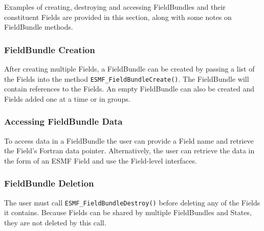 

Examples of creating, destroying and accessing FieldBundles and their
constituent Fields are provided in this section, along with some
notes on FieldBundle methods.

\subsubsection{FieldBundle Creation}

After creating multiple Fields, a FieldBundle
can be created by passing a list of the Fields into the 
method {\tt ESMF\_FieldBundleCreate()}.  The FieldBundle will contain
references to the Fields.  An empty FieldBundle can also be created
and Fields added one at a time or in groups.

\subsubsection{Accessing FieldBundle Data}

To access data in a FieldBundle the user can provide a Field
name and retrieve the Field's Fortran data pointer.  Alternatively,
the user can retrieve the data in the form of an ESMF 
Field and use the Field-level interfaces.

\subsubsection{FieldBundle Deletion}

The user must call {\tt ESMF\_FieldBundleDestroy()} before 
deleting any of the Fields it contains.  Because Fields
can be shared by multiple FieldBundles and States, they are
not deleted by this call.


